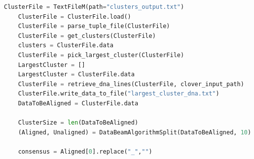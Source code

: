\begin{lstlisting}[language=Python, caption={Gettingprimér from clustering}, label={lst:python-get-primer} ]
    ClusterFile = TextFileM(path="clusters_output.txt")
    ClusterFile = ClusterFile.load()
    ClusterFile = parse_tuple_file(ClusterFile)
    ClusterFile = get_clusters(ClusterFile)
    clusters = ClusterFile.data
    ClusterFile = pick_largest_cluster(ClusterFile)
    LargestCluster = []
    LargestCluster = ClusterFile.data
    ClusterFile = retrieve_dna_lines(ClusterFile, clover_input_path)
    ClusterFile.write_data_to_file("largest_cluster_dna.txt")
    DataToBeAligned = ClusterFile.data

    ClusterSize = len(DataToBeAligned)
    (Aligned, Unaligned) = DataBeamAlgorithmSplit(DataToBeAligned, 10)

    consensus = Aligned[0].replace("_","")
\end{lstlisting}